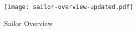 \begin{figure}
    \texttt{[image: sailor-overview-updated.pdf]}
    \caption{Sailor Overview}
    \label{fig:sailor}
\end{figure}
